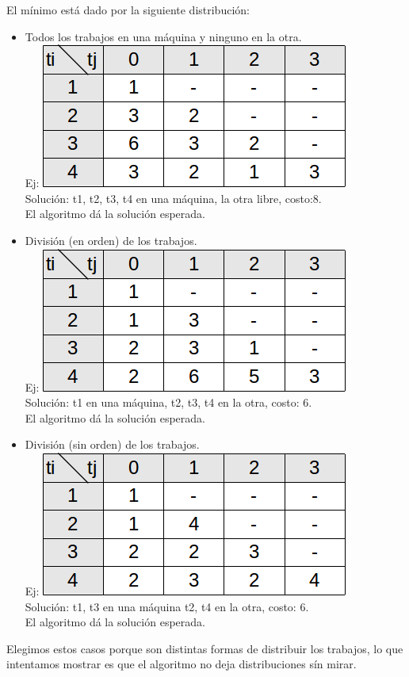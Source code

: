 El mínimo está dado por la siguiente distribución:
\begin{itemize}
\item Todos los trabajos en una máquina y ninguno en la otra.\\
Ej: \includegraphics[scale=0.6]{ej1/caso2.png} \\
Solución: t1, t2, t3, t4 en una máquina, la otra libre, costo:8.\\
El algoritmo dá la solución esperada.\\

\item División (en orden) de los trabajos.\\
Ej: \includegraphics[scale=0.6]{ej1/caso3.png} \\
Solución: t1 en una máquina, t2, t3, t4 en la otra, costo: 6.\\
El algoritmo dá la solución esperada.\\

\item División (sin orden) de los trabajos.\\
Ej: \includegraphics[scale=0.6]{ej1/caso4.png} \\
Solución: t1, t3 en una máquina t2, t4 en la otra, costo: 6.\\
El algoritmo dá la solución esperada.\\
\end{itemize}

Elegimos estos casos porque son distintas formas de distribuir los trabajos, lo que intentamos mostrar es que el algoritmo no deja distribuciones sín mirar.\\